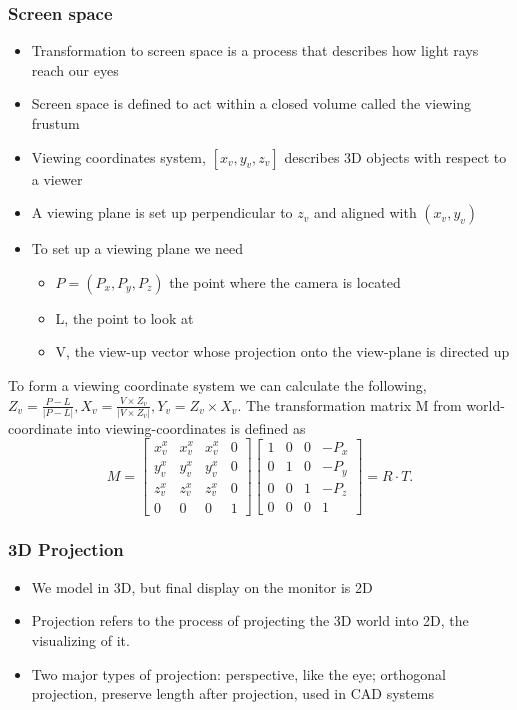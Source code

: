 \documentclass[11pt]{article}
\begin{document}
\subsubsection*{Screen space}
\begin{itemize}
    \item Transformation to screen space is a process that describes how light rays reach our eyes
    \item Screen space is defined to act within a closed volume called the viewing frustum
\end{itemize}

\begin{itemize}
    \item Viewing coordinates system, $[x_v, y_v, z_v]$ describes 3D objects with respect to a viewer
    \item A viewing plane is set up perpendicular to $z_v$ and aligned with $(x_v, y_v)$
    \item To set up a viewing plane we need
    \begin{itemize}
        \item $P = (P_x, P_y, P_z)$ the point where the camera is located
        \item L, the point to look at 
        \item V, the view-up vector whose projection onto the view-plane is directed up
    \end{itemize}
\end{itemize}

To form a viewing coordinate system we can calculate the following, $Z_v = \frac{P-L}{|P-L|}, X_v = \frac{V\times Z_v}{|V\times Z_v|}, Y_v = Z_v \times X_v$. The transformation matrix M from world-coordinate into viewing-coordinates is defined as 
\[
M = \begin{bmatrix} x_v^x & x_v^x & x_v^x & 0 \\ y_v^x & y_v^x & y_v^x & 0 \\ z_v^x & z_v^x & z_v^x & 0 \\ 0 & 0 & 0 & 1  \end{bmatrix}  \begin{bmatrix} 1 & 0 & 0 & -P_x\\ 0 & 1 & 0 & -P_y \\ 0 & 0 & 1 & -P_z\\ 0 & 0 & 0 & 1 \end{bmatrix} = R\cdot T 
.\]  

\subsubsection*{3D Projection}
\begin{itemize}
    \item We model in 3D, but final display on the monitor is 2D
    \item Projection refers to the process of projecting the 3D world into 2D, the visualizing of it.
    \item Two major types of projection: perspective, like the eye; orthogonal projection, preserve length after projection, used in CAD systems
\end{itemize}
\end{document}
